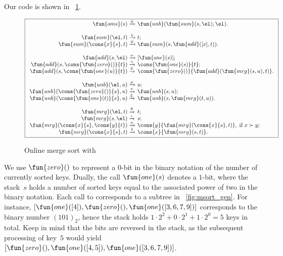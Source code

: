 Our code is shown in \fig~\ref{fig:oms}.
\begin{figure}
\begin{equation*}
\boxed{%
\begin{array}{r@{\;}l@{\;}l}
\fun{oms}(s)   & \xrightarrow{\smash{\phi}}
               & \fun{unb}(\fun{sum}(s,\el),\el).\\
\\
\fun{sum}(\el,t)         & \xrightarrow{\smash{\chi}} & t;\\
\fun{sum}(\cons{x}{s},t) & \xrightarrow{\smash{\psi}}
                         & \fun{sum}(s,\fun{add}([x],t)).\\
\\
\fun{add}(s,\el) & \xrightarrow{\smash{\omega}} & [\fun{one}(s)];\\
\fun{add}(s,\cons{\fun{zero}()}{t})
                    & \xrightarrow{\smash{\gamma}}
                    & \cons{\fun{one}(s)}{t};\\
\fun{add}(s,\cons{\fun{one}(u)}{t}) & \xrightarrow{\smash{\delta}}
                    & \cons{\fun{zero}()}{\fun{add}(\fun{mrg}(s,u),t)}.\\
\\
\fun{unb}(\el,u) & \xrightarrow{\smash{\mu}} & u;\\
\fun{unb}(\cons{\fun{zero}()}{s},u)
                 & \xrightarrow{\smash{\nu}} & \fun{unb}(s,u);\\
\fun{unb}(\cons{\fun{one}(t)}{s},u)
                 & \xrightarrow{\smash{\xi}}
                 & \fun{unb}(s,\fun{mrg}(t,u)).\\
\\
\fun{mrg}(\el,t)         & \xrightarrow{\smash{\theta}} & t;\\
\fun{mrg}(s,\el)         & \xrightarrow{\smash{\iota}} & s;\\
\fun{mrg}(\cons{x}{s},\cons{y}{t}) & \xrightarrow{\smash{\kappa}}
                         & \cons{y}{\fun{mrg}(\cons{x}{s},t)},\;
                           \text{if \(x \succ y\)};\\
\fun{mrg}(\cons{x}{s},t) & \xrightarrow{\smash{\lambda}}
                         & \cons{x}{\fun{mrg}(s,t)}.
\end{array}}
\end{equation*}
\caption{Online merge sort with }
\label{fig:oms}
\end{figure}
We use \(\fun{zero}()\) to represent a
\(0\)-bit in the binary notation of the number of currently sorted
keys. Dually, the call \(\fun{one}(s)\) denotes
a \(1\)-bit, where the stack~\(s\) holds a number of sorted keys equal
to the associated power of two in the binary notation. Each call to
 corresponds to a subtree in
\fig~\vref{fig:msort_gen}. For instance, \([\fun{one}([4]),
\fun{zero}(), \fun{one}([3,6,7,9])]\) corresponds to the binary number
\((101)_2\), hence the stack holds \(1 \cdot 2^2 + 0 \cdot 2^1 + 1
\cdot 2^0 = 5\) keys in total. Keep in mind that the bits are reversed
in the stack, as the subsequent processing of key~\(5\) would yield
\([\fun{zero}(),\fun{one}([4,5]),\fun{one}([3,6,7,9])]\).

